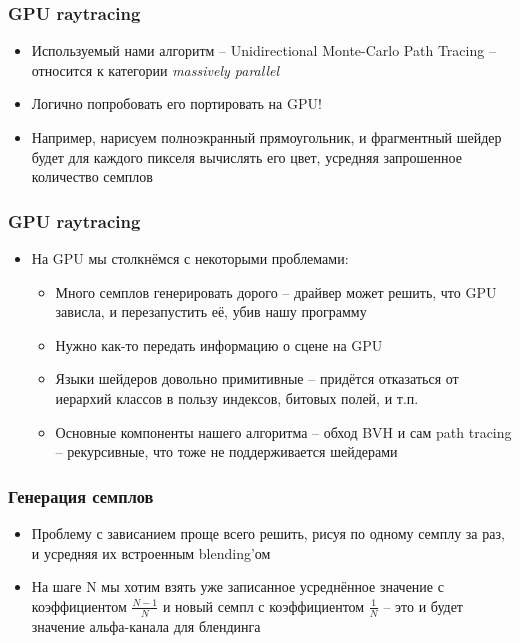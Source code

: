 \documentclass[10pt]{beamer}
\begin{document}
\begin{frame}[fragile]
\frametitle{GPU raytracing}
\begin{itemize}
\item Используемый нами алгоритм -- Unidirectional Monte-Carlo Path Tracing -- относится к категории \textit{massively parallel}
\pause
\item Логично попробовать его портировать на GPU!
\pause
\item Например, нарисуем полноэкранный прямоугольник, и фрагментный шейдер будет для каждого пикселя вычислять его цвет, усредняя запрошенное количество семплов
\end{itemize}
\end{frame}

\begin{frame}[fragile]
\frametitle{GPU raytracing}
\begin{itemize}
\item На GPU мы столкнёмся с некоторыми проблемами:
\pause
\begin{itemize}
\item Много семплов генерировать дорого -- драйвер может решить, что GPU зависла, и перезапустить её, убив нашу программу
\pause
\item Нужно как-то передать информацию о сцене на GPU
\pause
\item Языки шейдеров довольно примитивные -- придётся отказаться от иерархий классов в пользу индексов, битовых полей, и т.п.
\pause
\item Основные компоненты нашего алгоритма -- обход BVH и сам path tracing -- рекурсивные, что тоже не поддерживается шейдерами
\end{itemize}
\end{itemize}
\end{frame}

\begin{frame}[fragile]
\frametitle{Генерация семплов}
\begin{itemize}
\item Проблему с зависанием проще всего решить, рисуя по одному семплу за раз, и усредняя их встроенным blending'ом
\pause
\item На шаге N мы хотим взять уже записанное усреднённое значение с коэффициентом \begin{math}\frac{N-1}{N}\end{math} и новый семпл с коэффициентом \begin{math}\frac{1}{N}\end{math} -- это и будет значение альфа-канала для блендинга
\end{itemize}
\end{frame}
\end{document}
